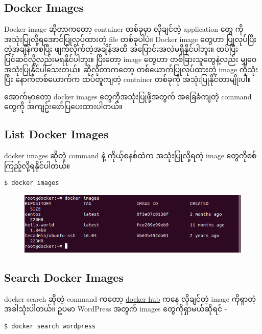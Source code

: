 \documentclass{article}
\begin{document}
\subsection{Docker Images}\label{docker-images-1}

Docker image ဆိုတာကတော့ container တစ်ခုမှာ လိုချင်တဲ့ application တွေ
ကိုအသုံးပြုလို့ရအောင်ပြုလုပ်ထားတဲ့ file တစ်ခုပါပဲ။ Docker image တွေဟာ
ပြုလုပ်ပြီးတဲ့အချိန်ကစပြီး ဖျက်လိုက်တဲ့အချိန်အထိ
အပြောင်းအလဲမရှိနိုင်ပါဘူး။ ထပ်ပြီးပြင်ဆင်လို့လည်းမရနိုင်ပါဘူး။ ပြီးတော့
image တွေဟာ တစ်ခြားသူတွေနဲ့လည်း မျှဝေအသုံးပြုနိုင်ပါသေးတယ်။
ဆိုလိုတာကတော့ တစ်ယောက်ပြုလုပ်ထားတဲ့ image ကိုသုံးပြီး နောက်တစ်ယောက်က
ထပ်တူကျတဲ့ container တစ်ခုကို အသုံးပြုနိုင်တာမျိုးပါ။

အောက်မှာတော့ docker images တွေကိုအသုံးပြုဖို့အတွက် အခြေခံကျတဲ့ command
တွေကို အကျဥ်းဖော်ပြပေးထားပါတယ်။

\subsection{List Docker Images}\label{list-docker-images}

docker images ဆိုတဲ့ command နဲ့ ကိုယ့်စနစ်ထဲက အသုံးပြုလို့ရတဲ့ image
တွေကိုစစ်ကြည့်လို့ရနိုင်ပါတယ်။

\begin{verbatim}
$ docker images
\end{verbatim}

\begin{figure}[htbp]
\centering
\includegraphics[width=0.70\paperwidth]{.gitbook/assets/1_ls.png}
\end{figure}

\subsection{Search Docker Images}\label{search-docker-images}

docker search ဆိုတဲ့ command ကတော့ \href{https://hub.docker.com/}{docker
hub} ကနေ လိုချင်တဲ့ image ကိုရှာတဲ့အခါသုံးပါတယ်။ ဥပမာ WordPress အတွက်
images တွေကိုရှာမယ်ဆိုရင် -

\begin{verbatim}
$ docker search wordpress
\end{verbatim}
\end{document}
